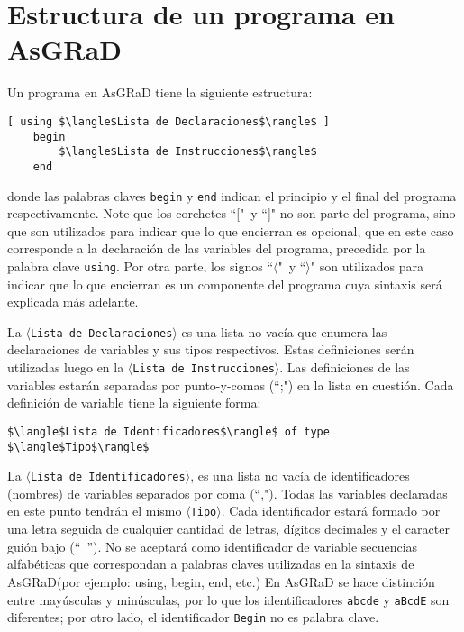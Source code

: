 \documentclass[letterpaper,11pt]{article}
\newcommand{\asgrad}{AsGRaD\xspace}
\newcommand{\general}[1]{$\langle$\texttt{#1}$\rangle$}
\begin{document}
\section{Estructura de un programa en \asgrad}

Un programa en \asgrad tiene la siguiente estructura:

\begin{lstlisting}[mathescape=true]
    [ using $\langle$Lista de Declaraciones$\rangle$ ]
    begin
        $\langle$Lista de Instrucciones$\rangle$
    end
\end{lstlisting}

\noindent
donde las palabras claves \texttt{begin} y \texttt{end} indican el principio y el final del programa respectivamente. Note que los corchetes ``["\ y ``]" no son parte del programa, sino que son utilizados para indicar que lo que encierran es opcional, que en este caso corresponde a la declaración de las variables del programa, precedida por la palabra clave \texttt{using}. Por otra parte, los signos ``$\langle$"\ y ``$\rangle$" son utilizados para indicar que lo que encierran es un componente del programa cuya sintaxis será explicada más adelante.

La $\langle$\texttt{Lista de Declaraciones}$\rangle$ es una lista no vacía que enumera las declaraciones de variables y sus tipos respectivos. Estas definiciones serán utilizadas luego en la \general{Lista de Instrucciones}. Las definiciones de las variables estarán separadas por punto-y-comas (``;") en la lista en cuestión. Cada definición de variable tiene la siguiente forma:

\begin{lstlisting}[mathescape=true]
    $\langle$Lista de Identificadores$\rangle$ of type $\langle$Tipo$\rangle$
\end{lstlisting}


La $\langle$\texttt{Lista de Identificadores}$\rangle$, es una lista no vacía de identificadores (nombres) de variables separados por coma (``,"). Todas las variables declaradas en este punto tendrán el mismo $\langle$\texttt{Tipo}$\rangle$. Cada identificador estará formado por una letra seguida de cualquier cantidad de letras, dígitos decimales y el caracter guión bajo (``\texttt{\_}''). No se aceptará como identificador de variable secuencias alfabéticas que correspondan a palabras claves utilizadas en la sintaxis de \asgrad (por ejemplo: using, begin, end, etc.) En \asgrad se hace distinción entre mayúsculas y minúsculas, por lo que los identificadores \texttt{abcde} y \texttt{aBcdE} son diferentes; por otro lado, el identificador \texttt{Begin} no es palabra clave.
\end{document}
